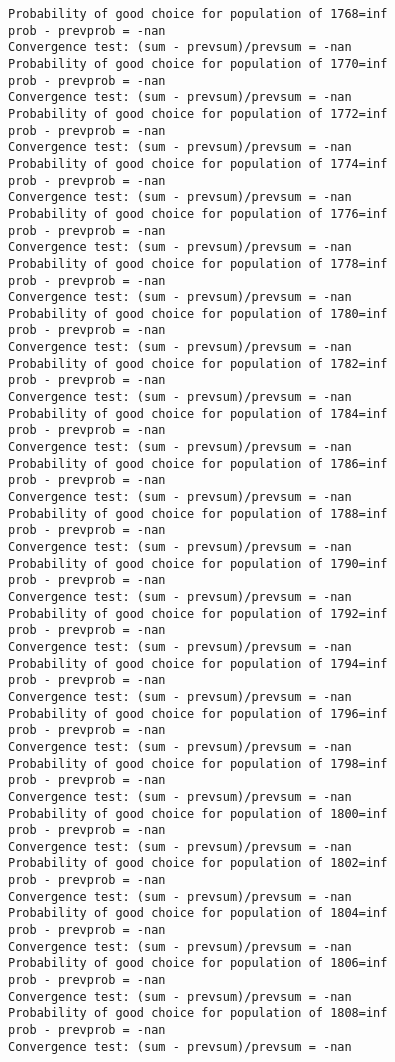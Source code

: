 \documentclass[11pt,onecolumn]{article}
\begin{document}
\begin{verbatim}
Probability of good choice for population of 1768=inf
prob - prevprob = -nan
Convergence test: (sum - prevsum)/prevsum = -nan
Probability of good choice for population of 1770=inf
prob - prevprob = -nan
Convergence test: (sum - prevsum)/prevsum = -nan
Probability of good choice for population of 1772=inf
prob - prevprob = -nan
Convergence test: (sum - prevsum)/prevsum = -nan
Probability of good choice for population of 1774=inf
prob - prevprob = -nan
Convergence test: (sum - prevsum)/prevsum = -nan
Probability of good choice for population of 1776=inf
prob - prevprob = -nan
Convergence test: (sum - prevsum)/prevsum = -nan
Probability of good choice for population of 1778=inf
prob - prevprob = -nan
Convergence test: (sum - prevsum)/prevsum = -nan
Probability of good choice for population of 1780=inf
prob - prevprob = -nan
Convergence test: (sum - prevsum)/prevsum = -nan
Probability of good choice for population of 1782=inf
prob - prevprob = -nan
Convergence test: (sum - prevsum)/prevsum = -nan
Probability of good choice for population of 1784=inf
prob - prevprob = -nan
Convergence test: (sum - prevsum)/prevsum = -nan
Probability of good choice for population of 1786=inf
prob - prevprob = -nan
Convergence test: (sum - prevsum)/prevsum = -nan
Probability of good choice for population of 1788=inf
prob - prevprob = -nan
Convergence test: (sum - prevsum)/prevsum = -nan
Probability of good choice for population of 1790=inf
prob - prevprob = -nan
Convergence test: (sum - prevsum)/prevsum = -nan
Probability of good choice for population of 1792=inf
prob - prevprob = -nan
Convergence test: (sum - prevsum)/prevsum = -nan
Probability of good choice for population of 1794=inf
prob - prevprob = -nan
Convergence test: (sum - prevsum)/prevsum = -nan
Probability of good choice for population of 1796=inf
prob - prevprob = -nan
Convergence test: (sum - prevsum)/prevsum = -nan
Probability of good choice for population of 1798=inf
prob - prevprob = -nan
Convergence test: (sum - prevsum)/prevsum = -nan
Probability of good choice for population of 1800=inf
prob - prevprob = -nan
Convergence test: (sum - prevsum)/prevsum = -nan
Probability of good choice for population of 1802=inf
prob - prevprob = -nan
Convergence test: (sum - prevsum)/prevsum = -nan
Probability of good choice for population of 1804=inf
prob - prevprob = -nan
Convergence test: (sum - prevsum)/prevsum = -nan
Probability of good choice for population of 1806=inf
prob - prevprob = -nan
Convergence test: (sum - prevsum)/prevsum = -nan
Probability of good choice for population of 1808=inf
prob - prevprob = -nan
Convergence test: (sum - prevsum)/prevsum = -nan

\end{verbatim}
\end{document}
